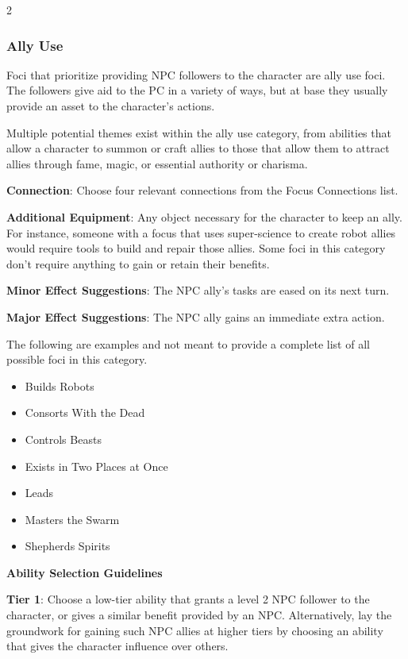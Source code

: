 \begin{multicols}{2}
\subsubsection{Ally Use}

Foci that prioritize providing NPC followers to the character are ally use foci. The followers give aid to the PC in a variety of ways, but at base they usually provide an asset to the character’s actions.

Multiple potential themes exist within the ally use category, from abilities that allow a character to summon or craft allies to those that allow them to attract allies through fame, magic, or essential authority or charisma. 

\textbf{Connection}: Choose four relevant connections from the Focus Connections list. 

\textbf{Additional Equipment}: Any object necessary for the character to keep an ally. For instance, someone with a focus that uses super-science to create robot allies would require tools to build and repair those allies. Some foci in this category don’t require anything to gain or retain their benefits.

\textbf{Minor Effect Suggestions}: The NPC ally’s tasks are eased on its next turn.

\textbf{Major Effect Suggestions}: The NPC ally gains an immediate extra action.

The following are examples and not meant to provide a complete list of all possible foci in this category.

\begin{itemize}
\item Builds Robots
\item Consorts With the Dead
\item Controls Beasts
\item Exists in Two Places at Once
\item Leads
\item Masters the Swarm
\item Shepherds Spirits
\end{itemize}

\textbf{Ability Selection Guidelines}

\textbf{Tier 1}: Choose a low-tier ability that grants a level 2 NPC follower to the character, or gives a similar benefit provided by an NPC. Alternatively, lay the groundwork for gaining such NPC allies at higher tiers by choosing an ability that gives the character influence over others.


\end{multicols}
